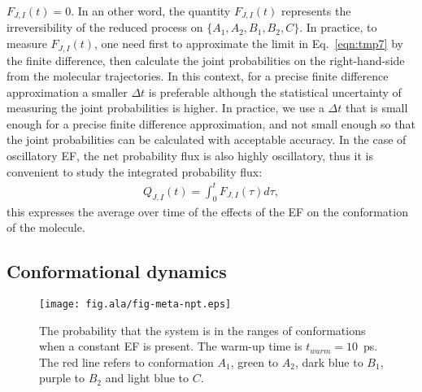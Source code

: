 \documentclass[a4paper,preprint,unsortedaddress,onecolumn]{revtex4-1}
\begin{document}
$ F_{J,I}(t) = 0$. In an other word, the quantity $ F_{J,I}(t) $ represents
the irreversibility of the reduced process on
$\{A_1, A_2, B_1, B_2, C\}$.
In practice, to measure $ F_{J,I}(t)$, one need first to approximate the limit
in Eq.~\eqref{eqn:tmp7} by the finite difference,
then calculate the joint probabilities on
the right-hand-side from the molecular trajectories.
In this context, for a precise finite difference approximation a smaller $\Delta t$ is
preferable although the statistical uncertainty of measuring the joint probabilities
is higher. In practice,
we use a $\Delta t$ that is small enough for a precise finite difference approximation,
and not small enough so that the joint probabilities can be calculated with acceptable accuracy.
In the case of oscillatory EF, the net probability flux is also highly oscillatory,
thus it is convenient to study the integrated probability flux:
\begin{align}
  Q_{J,I} (t) = \int_0^t F_{J,I}(\tau)d \tau,
\end{align}
this expresses the average over time of the effects of the EF on the conformation of the molecule.





\subsection{Conformational dynamics}


\begin{figure}
  \centering
  \texttt{[image: fig.ala/fig-meta-npt.eps]}
  \caption{The probability that the system is in the ranges of conformations when a constant EF is present.
    The warm-up time is $t_{warm} = 10$~ps. The red line refers to conformation $A_1$,
    green to $A_2$, dark blue to $B_1$, purple to $B_2$ and light blue
    to $C$.
  }
  \label{fig:tmp5}
\end{figure}
\end{document}
